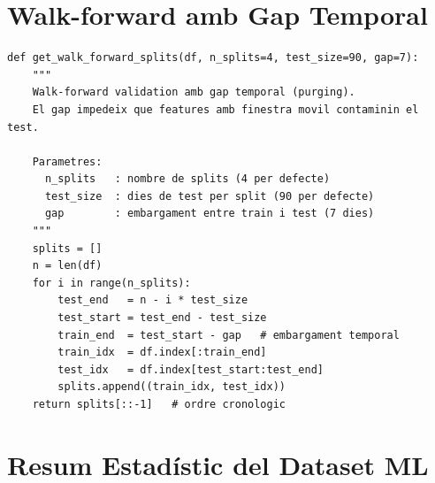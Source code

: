 \documentclass[12pt, a4paper]{report}
\begin{document}
\chapter{Walk-forward amb Gap Temporal}

\begin{lstlisting}[style=python, caption={Configuracio walk-forward amb embargament (data\_loader.py)}]
def get_walk_forward_splits(df, n_splits=4, test_size=90, gap=7):
    """
    Walk-forward validation amb gap temporal (purging).
    El gap impedeix que features amb finestra movil contaminin el test.
    
    Parametres:
      n_splits   : nombre de splits (4 per defecte)
      test_size  : dies de test per split (90 per defecte)
      gap        : embargament entre train i test (7 dies)
    """
    splits = []
    n = len(df)
    for i in range(n_splits):
        test_end   = n - i * test_size
        test_start = test_end - test_size
        train_end  = test_start - gap   # embargament temporal
        train_idx  = df.index[:train_end]
        test_idx   = df.index[test_start:test_end]
        splits.append((train_idx, test_idx))
    return splits[::-1]   # ordre cronologic
\end{lstlisting}

\chapter{Resum Estadístic del Dataset ML}
\end{document}
